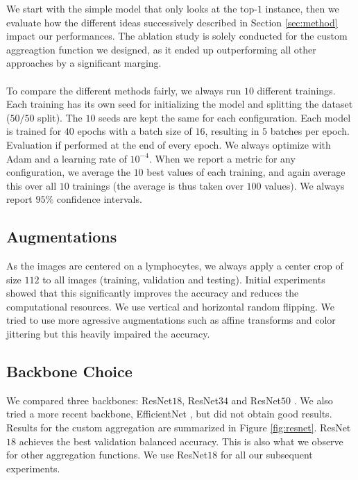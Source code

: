 \documentclass[final]{cvpr}
\begin{document}
	We start with the simple model that only looks at the top-$1$ instance, then we evaluate how the different ideas successively described in Section \ref{sec:method} impact our performances. The ablation study is solely conducted for the custom aggreagtion function we designed, as it ended up outperforming all other approaches by a significant marging.\\
	\\
	To compare the different methods fairly, we always run $10$ different trainings. Each training has its own seed for initializing the model and splitting the dataset ($50/50$ split). The $10$ seeds are kept the same for each configuration. Each model is trained for $40$ epochs with a batch size of $16$, resulting in $5$ batches per epoch. Evaluation if performed at the end of every epoch. We always optimize with Adam and a learning rate of $10^{-4}$. When we report a metric for any configuration, we average the $10$ best values of each training, and again average this over all $10$ trainings (the average is thus taken over $100$ values). We always report $95\%$ confidence intervals.

	\subsection{Augmentations}
	
	As the images are centered on a lymphocytes, we always apply a center crop of size $112$ to all images (training, validation and testing). Initial experiments showed that this significantly improves the accuracy and reduces the computational resources. We use vertical and horizontal random flipping. We tried to use more agressive augmentations such as affine transforms and color jittering but this heavily impaired the accuracy.

	\subsection{Backbone Choice}
	
	We compared three backbones: ResNet$18$, ResNet$34$ and ResNet$50$ \cite{resnet}. We also tried a more recent backbone, EfficientNet \cite{efn}, but did not obtain good results. Results for the custom aggregation are summarized in Figure \ref{fig:resnet}. ResNet$18$ achieves the best validation balanced accuracy. This is also what we observe for other aggregation functions. We use ResNet$18$ for all our subsequent experiments.
\end{document}

